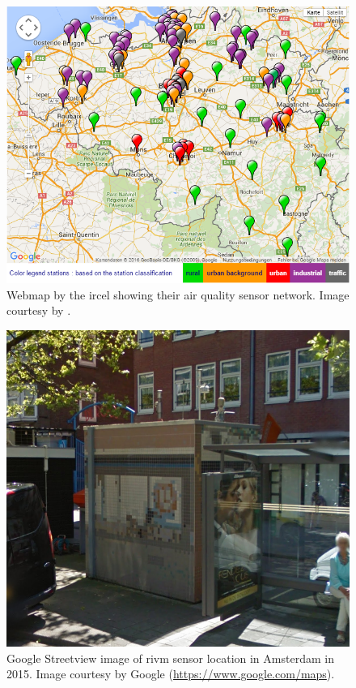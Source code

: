 \begin{figure}[!h]
	\centering
	\includegraphics[width=0.6\linewidth]{figs/IRCELINESensors.png}
	\caption{Webmap by the \acf{ircel} showing their air quality sensor network. Image courtesy by \cite{DATA:IRCEL}.}
	\label{fig:IRCELINESensor}
\end{figure}

\begin{figure}[!h]
	\centering
	\includegraphics[width=1\linewidth]{figs/SensorAdam.png}
	\caption{Google Streetview image of \ac{rivm} sensor location in Amsterdam in 2015. Image courtesy by Google (\url{https://www.google.com/maps}).}
	\label{fig:Sensor}
\end{figure}
